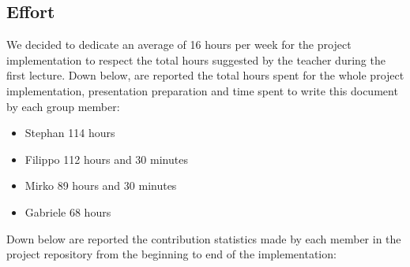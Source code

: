 \subsection{Effort}
We decided to dedicate an average of 16 hours per week for the project implementation to respect the total hours suggested by the teacher during the first lecture.\newline
Down below, are reported the total hours spent for the whole project implementation, presentation preparation and time spent to write this document by each group member:
\begin{itemize}
  \item Stephan 114 hours
  \item Filippo 112 hours and 30 minutes
  \item Mirko 89 hours and 30 minutes
  \item Gabriele 68 hours
\end{itemize}
Down below are reported the contribution statistics made by each member in the project repository from the beginning to end of the implementation:
